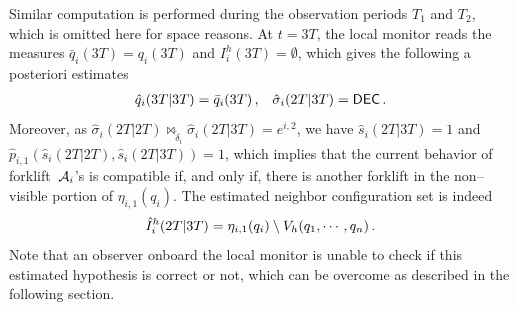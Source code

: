 \documentclass[journal, onecolumn, 12pt]{styles/IEEEtran}
\begin{document}
Similar computation is performed during the observation periods $T_1$ and $T_2$, which is omitted here for space reasons. At $t=3T$, the local monitor reads the measures $\bar{q}_i(3T) = q_i(3T)$ and $I_i^h(3T) = \emptyset$, which gives the following a posteriori estimates 
$$
\begin{array}{l}
\hat{q}_i(3T|3T) = \bar{q}_i(3T) \, , \;\;\; \hat{\sigma}_i(2T|3T) = \mdec \, .
\end{array}
$$
Moreover, as $\hat{\sigma}_i(2T|2T) \bowtie_{\tilde{\delta}_i} \hat{\sigma}_i(2T|3T) = e^{i,2}$, we have $\hat{s}_i(2T|3T) = 1$ and $\hat{p}_{i,1}(\hat{s}_i(2T|2T), \hat{s}_i(2T|3T))=1$, which implies that the current behavior of forklift~$\mathcal{A}_i$'s is compatible if, and only if, there is another forklift in the non--visible portion of $\eta_{i,1}(q_i)$. The estimated neighbor configuration set is indeed
$$
\hat{I}_i^h(2T|3T) = \eta_{i,1}(q_i) \setminus V_h(q_1, \cdots, q_n)
\, .
$$
Note that an observer onboard the local monitor is unable to check if this estimated hypothesis is correct or not, which can be overcome as described in the following section.
\\

\end{document}

